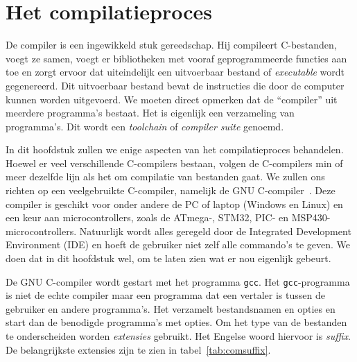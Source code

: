 \chapter{Het compilatieproces}
\label{cha:compilatieproces}
\thispagestyle{empty}

De compiler is een ingewikkeld stuk gereedschap. Hij compileert C-bestanden, voegt ze samen, voegt er bibliotheken met vooraf geprogrammeerde functies aan toe en zorgt ervoor dat uiteindelijk een uitvoerbaar bestand of \textsl{executable} wordt gegenereerd. Dit uitvoerbaar bestand bevat de instructies die door de computer kunnen worden uitgevoerd. We moeten direct opmerken dat de ``compiler'' uit meerdere programma's bestaat. Het is eigenlijk een verzameling van programma's. Dit wordt een \textsl{toolchain} of \textsl{compiler suite} genoemd.

In dit hoofdstuk zullen we enige aspecten van het compilatieproces behandelen. Hoewel er veel verschillende C-compilers bestaan, volgen de C-compilers min of meer dezelfde lijn als het om compilatie van bestanden gaat. We zullen ons richten op een veelgebruikte C-compiler, namelijk de GNU C-compiler~\cite{gnugcc}. Deze compiler is geschikt voor onder andere de PC of laptop (Windows en Linux) en een keur aan microcontrollers, zoals de ATmega-, STM32, PIC- en MSP430-microcontrollers. Natuurlijk wordt alles geregeld door de Integrated Development Environment (IDE) en hoeft de gebruiker niet zelf alle commando's te geven. We doen dat in dit hoofdstuk wel, om te laten zien wat er nou eigenlijk gebeurt.


De GNU C-compiler wordt gestart met het programma \texttt{gcc}. Het \texttt{gcc}-programma is niet de echte compiler maar een programma dat een vertaler is tussen de gebruiker en andere programma's. Het verzamelt bestandsnamen en opties en start dan de benodigde programma's met opties.
%
Om het type van de bestanden te onderscheiden worden \textsl{extensies} gebruikt. Het Engelse woord hiervoor is \textsl{suffix}. De belangrijkste extensies zijn te zien in tabel~\ref{tab:comsuffix}.

